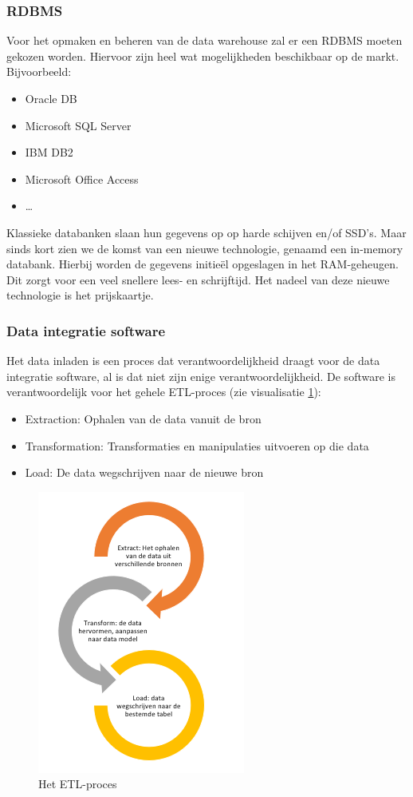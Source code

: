 \subsubsection{RDBMS}
Voor het opmaken en beheren van de data warehouse zal er een RDBMS moeten gekozen worden. Hiervoor zijn heel wat mogelijkheden beschikbaar op de markt. Bijvoorbeeld: 

\begin{itemize}
	\item Oracle DB
	\item Microsoft SQL Server
	\item IBM DB2
	\item Microsoft Office Access
	\item \ldots
\end{itemize} 

Klassieke databanken slaan hun gegevens op op harde schijven en/of SSD's. Maar sinds kort zien we de komst van een nieuwe technologie, genaamd een in-memory databank. Hierbij worden de gegevens initieël opgeslagen in het RAM-geheugen. Dit zorgt voor een veel snellere lees- en schrijftijd. Het nadeel van deze nieuwe technologie is het prijskaartje.

\subsubsection{Data integratie software}
\label{sec:etl}
Het data inladen is een proces dat verantwoordelijkheid draagt voor de data integratie software, al is dat niet zijn enige verantwoordelijkheid. De software is verantwoordelijk voor het gehele ETL-proces (zie visualisatie \ref{fig:etl}):

\begin{itemize}
	\item Extraction: Ophalen van de data vanuit de bron
	\item Transformation: Transformaties en manipulaties uitvoeren op die data
	\item Load: De data wegschrijven naar de nieuwe bron
\end{itemize} 

\begin{figure}[h]
	\centering
	\includegraphics[scale=1]{../images/ETL.PNG}
	\caption{Het ETL-proces}
	\label{fig:etl}
\end{figure}

